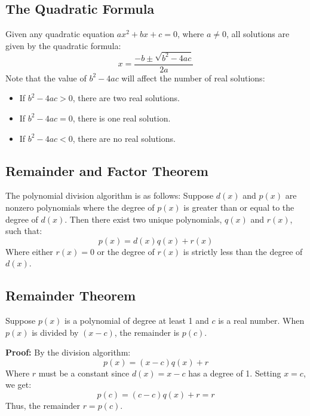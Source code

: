 \subsection{The Quadratic Formula}
\label{sss:theq-f874}

Given any quadratic equation $ax^2 + bx + c = 0$, where $a \neq 0$, all solutions are given by the quadratic formula:
\[
x = \frac{-b \pm \sqrt{b^2 - 4ac}}{2a}
\]
Note that the value of $b^2 - 4ac$ will affect the number of real solutions:

\begin{itemize}
    \item If $b^2 - 4ac > 0$, there are two real solutions.
    \item If $b^2 - 4ac = 0$, there is one real solution.
    \item If $b^2 - 4ac < 0$, there are no real solutions.
\end{itemize}

\subsection{Remainder and Factor Theorem}
\label{sss:rema-cd36}

The polynomial division algorithm is as follows: Suppose $d(x)$ and $p(x)$ are nonzero polynomials where the degree of $p(x)$ is greater than or equal to the degree of $d(x)$. Then there exist two unique polynomials, $q(x)$ and $r(x)$, such that:
\[
p(x) = d(x)q(x) + r(x)
\]
Where either $r(x) = 0$ or the degree of $r(x)$ is strictly less than the degree of $d(x)$.

\subsection{Remainder Theorem}
\label{sss:rema-0f44}

Suppose $p(x)$ is a polynomial of degree at least 1 and $c$ is a real number. When $p(x)$ is divided by $(x - c)$, the remainder is $p(c)$.

\textbf{Proof:} By the division algorithm:
\[
p(x) = (x - c)q(x) + r
\]
Where $r$ must be a constant since $d(x) = x - c$ has a degree of 1. Setting $x = c$, we get:
\[
p(c) = (c - c)q(x) + r = r
\]
Thus, the remainder $r = p(c)$.

